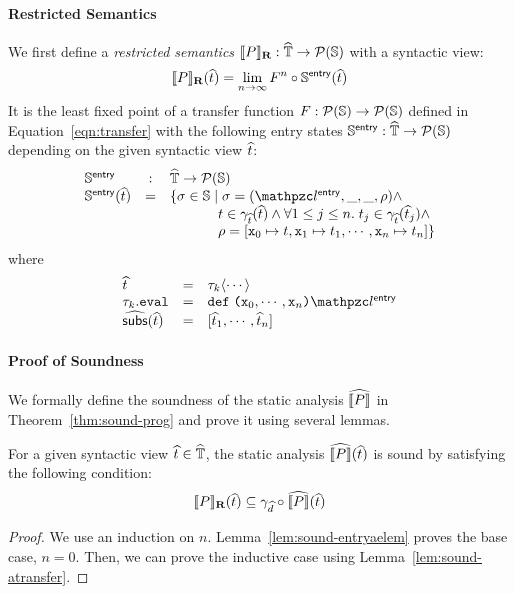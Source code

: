 \paragraph{Restricted Semantics} We first define a \textit{restricted semantics}
$\llbracket{P}\rrbracket_\textbf{R}: \widehat{\mathbb{T}} \rightarrow \mathcal{P}(\mathbb{S})$ with a syntactic view:
\[
  \llbracket{P}\rrbracket_\textbf{R}(\widehat{t}) = \lim_{n \rightarrow \infty}F^n \circ
  \mathbb{S}^{\textsf{entry}}(\widehat{t})
\]
It is the least fixed point of a transfer function $F: \mathcal{P}(\mathbb{S})
\rightarrow \mathcal{P}(\mathbb{S})$ defined in Equation~\ref{eqn:transfer} with the
following entry states $\mathbb{S}^{\textsf{entry}}: \widehat{\mathbb{T}} \rightarrow \mathcal{P}(\mathbb{S})$
depending on the given syntactic view $\widehat{t}$:
\[
  \begin{array}{lcl}
    \entrystset &:& \atreeset \rightarrow \powerset{\stset}\\

    \entrystset(\atree) &=& \{ \st \in \stset \mid
      \st = (\entrylab, \_, \_, \env) \wedge\\&&

      \phantom{\{ \st \in \stset \mid}
        \tree \in \atreegamma(\atree) \wedge \forall 1 \leq j \leq n. \;
      \tree_j \in \atreegamma(\atree_j) \wedge\\&&

      \phantom{\{ \st \in \stset \mid}
        \env = [\varx_0 \mapsto \tree, \varx_1 \mapsto \tree_1, \cdots,
        \varx_n \mapsto \tree_n]
      \}\\
    \end{array}
  \]
where
\[
  \begin{array}{lcl}
    \atree &=& \ty_k \langle \cdots \rangle\\
    \ty_k.\eval &=& \kwdef \; \kwrl \varx_0, \cdots, \varx_n \kwrr \entrylab\\
    \agetsubs(\atree) &=& [\atree_1, \cdots, \atree_n]\\
  \end{array}
\]


\paragraph{Proof of Soundness} We formally define the soundness of the static
analysis $\widehat{\llbracket{P}\rrbracket}$ in Theorem~\ref{thm:sound-prog} and prove it using
several lemmas.

\begin{theorem}\label{thm:sound-prog}
  For a given syntactic view $\widehat{t} \in \widehat{\mathbb{T}}$, the static analysis
  $\widehat{\llbracket{P}\rrbracket}(\widehat{t})$ is sound by satisfying the following condition:
  \[
    \llbracket{P}\rrbracket_\textbf{R}(\widehat{t}) \subseteq \gamma_{\widehat{d}} \circ \widehat{\llbracket{P}\rrbracket}(\widehat{t})
  \]
\end{theorem}
\begin{proof}
  We use an induction on $n$.  Lemma~\ref{lem:sound-entryaelem} proves the base
  case, $n=0$. Then, we can prove the inductive case using
  Lemma~\ref{lem:sound-atransfer}.
\end{proof}

